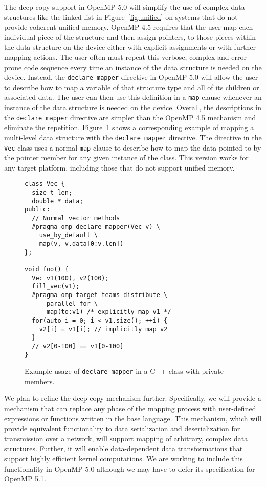 The deep-copy support in OpenMP 5.0 will simplify the use of complex data
structures like the linked list in Figure~\ref{fig:unified} on systems that 
do not provide coherent unified memory. OpenMP 4.5 requires that the user map 
each individual piece of the structure and then assign pointers, to those 
pieces within the data structure on the device either with explicit 
assignments or with further mapping actions. The user often must repeat this 
verbose, complex and error prone code sequence every time an instance of the 
data structure is needed on the device. Instead, the \texttt{declare mapper}
directive in OpenMP 5.0 will allow the user to describe how to map a variable 
of that structure type and all of its children or associated data. The user
can then use this definition in a \texttt{map} clause whenever an instance 
of the data structure is needed on the device. Overall, the descriptions in
the \texttt{declare mapper} directive are simpler than the OpenMP 4.5
mechanism and eliminate the repetition. Figure~\ref{fig:mapper} shows a
corresponding example of mapping a multi-level data structure with the
\texttt{declare mapper} directive.  The directive in the \texttt{Vec} class uses
a normal \texttt{map} clause to describe how to map the data pointed to by the
pointer member for any given instance of the class.  This version works for any
target platform, including those that do not support unified memory.

\begin{figure}
\begin{verbatim}
class Vec {
  size_t len;
  double * data;
public:
  // Normal vector methods
  #pragma omp declare mapper(Vec v) \
    use_by_default \
    map(v, v.data[0:v.len])
};

void foo() {
  Vec v1(100), v2(100);
  fill_vec(v1);
  #pragma omp target teams distribute \
      parallel for \
      map(to:v1) /* explicitly map v1 */
  for(auto i = 0; i < v1.size(); ++i) { 
    v2[i] = v1[i]; // implicitly map v2
  }
  // v2[0-100] == v1[0-100]
}
\end{verbatim}
\caption{Example usage of \texttt{declare mapper} in a C++ class with private
members.\label{fig:mapper}}
\end{figure}

We plan to refine the deep-copy mechanism further. Specifically, we will 
provide a mechanism that can replace any phase of the mapping process with 
user-defined expressions or functions written in the base language. This 
mechanism, which will provide equivalent functionality to data  serialization 
and deserialization for transmission over a network,  will support mapping 
of arbitrary, complex data structures. Further, it will enable data-dependent 
data transformations that support highly efficient kernel computations. We
are working to include this functionality in OpenMP 5.0 although we may
have to defer its specification for OpenMP 5.1.




